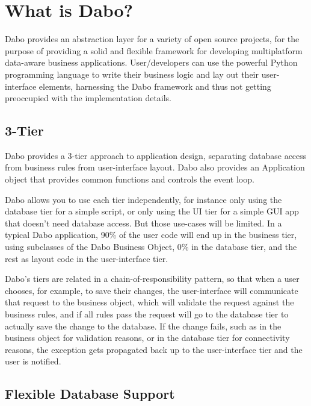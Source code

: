 
\chapter{What is Dabo?}

Dabo provides an abstraction layer for a variety of open source projects, for the purpose of providing a solid and flexible framework for developing multiplatform data-aware business applications. User/developers can use the powerful Python programming language to write their business logic and lay out their user-interface elements, harnessing the Dabo framework and thus not getting preoccupied with the implementation details.

\section{3-Tier}

Dabo provides a 3-tier approach to application design, separating database access from business rules from user-interface layout. Dabo also provides an Application object that provides common functions and controls the event loop.

Dabo allows you to use each tier independently, for instance only using the database tier for a simple script, or only using the UI tier for a simple GUI app that doesn't need database access. But those use-cases will be limited. In a typical Dabo application, 90\% of the user code will end up in the business tier, using subclasses of the Dabo Business Object, 0\% in the database tier, and the rest as layout code in the user-interface tier.

Dabo's tiers are related in a chain-of-responsibility pattern, so that when a user chooses, for example, to save their changes, the user-interface will communicate that request to the business object, which will validate the request against the business rules, and if all rules pass the request will go to the database tier to actually save the change to the database. If the change fails, such as in the business object for validation reasons, or in the database tier for connectivity reasons, the exception gets propagated back up to the user-interface tier and the user is notified.

\section{Flexible Database Support}

